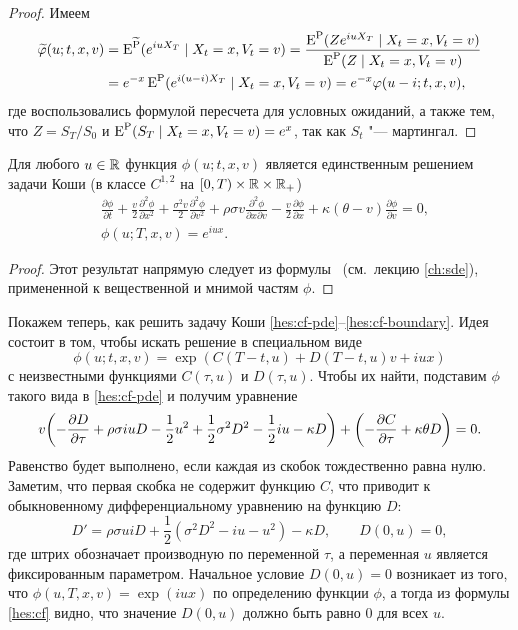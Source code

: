 \begin{proof}
Имеем
\[
\begin{split}
\widetilde{\varphi}(u; t,x,v) &= \operatorname{E}^{\widetilde{\mathrm{P}}} (e^{iu X_T}  \mid X_t=x, V_t = v)
= \frac{\operatorname{E}^{\mathrm{P}} (Z e^{iu X_T} \mid X_t=x, V_t = v)}{\operatorname{E}^{\mathrm{P}}(Z \mid X_t=x,V_t=v)} \\
&= e^{-x} \operatorname{E}^{\mathrm{P}} (e^{i(u-i)X_T} \mid X_t=x, V_t = v)
= e^{-x}\varphi(u-i; t,x,v),
\end{split}
\]
где воспользовались формулой пересчета для условных ожиданий, а также тем, что $Z=S_T/S_0$ и $\operatorname{E}^{\mathrm{P}}(S_T  \mid X_t=x, V_t = v) = e^x$, так как $S_t$ "--- мартингал.
\end{proof}

\begin{lemma}
Для любого $u\in \mathbb{R}$ функция $\phi(u;t,x,v)$ является единственным решением задачи Коши (в классе $C^{1,2}$ на $[0,T)\times\mathbb{R}\times\mathbb{R}_+$)
\begin{align}
\label{hes:cf-pde}
&\frac{\partial\phi}{\partial t} + \frac v2 \frac{\partial^2 \phi}{\partial x^2}  +\frac{\sigma^2v}{2} \frac{\partial^2\phi}{\partial v^2}
  + \rho\sigma v \frac{\partial^2\phi}{\partial x\partial v} -\frac v2 \frac{\partial \phi}{\partial x} 
  + \kappa(\theta-  v)\frac{\partial\phi}{\partial v} = 0,\\
\label{hes:cf-boundary}
&\phi(u;T,x,v) = e^{iu x}.
\end{align}
\end{lemma}

\begin{proof}
Этот результат напрямую следует из формулы \fc\ (см.~лекцию \ref{ch:sde}), примененной к вещественной и мнимой частям $\phi$.
\end{proof}

Покажем теперь, как решить задачу Коши \eqref{hes:cf-pde}--\eqref{hes:cf-boundary}.
Идея состоит в том, чтобы искать решение в специальном виде
\begin{equation}
\label{hes:cf}
\phi(u; t,x,v) = \exp(C(T-t,u) + D(T-t,u)v + iu x)
\end{equation}
с неизвестными функциями $C(\tau,u)$ и $D(\tau,u)$.
Чтобы их найти, подставим $\phi$ такого вида в \eqref{hes:cf-pde} и получим уравнение
\begin{equation}
\label{hes:CD-equation}
v\biggl(
  -\frac{\partial D}{\partial \tau} + \rho\sigma iu D - \frac12 u^2 
  + \frac12 \sigma^2 D^2 -\frac12 iu-\kappa D
\biggr) + \biggl(-\frac{\partial C}{\partial \tau} + \kappa\theta D\biggr) = 0.
\end{equation}
Равенство будет выполнено, если каждая из скобок тождественно равна нулю.
Заметим, что первая скобка не содержит функцию $C$, что приводит к обыкновенному дифференциальному уравнению на функцию $D$:
\[
D' = \rho\sigma ui D + \frac12 (\sigma^2 D^2 - iu - u^2) - \kappa D, \qquad D(0,u)=0,
\]
где штрих обозначает производную по переменной $\tau$, а переменная $u$ является фиксированным параметром.
Начальное условие $D(0,u)=0$ возникает из того, что $\phi(u,T,x,v) = \exp(iux)$ по определению функции $\phi$, а тогда из формулы \eqref{hes:cf} видно, что значение $D(0,u)$ должно быть равно 0 для всех $u$.

